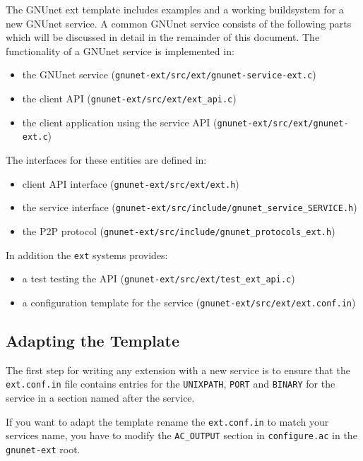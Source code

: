 \documentclass[10pt]{article}
\begin{document}
The GNUnet ext template includes examples and a working buildsystem for a new GNUnet service.
A common GNUnet service consists of the following parts which will be discussed in detail in the
remainder of this document. The functionality of a GNUnet service is implemented in:

\begin{itemize}
\itemsep0em
  \item the GNUnet service (\lstinline|gnunet-ext/src/ext/gnunet-service-ext.c|)
  \item the client API (\lstinline|gnunet-ext/src/ext/ext_api.c|)
  \item the client application using the service API (\lstinline|gnunet-ext/src/ext/gnunet-ext.c|)


\end{itemize}

The interfaces for these entities are defined in:
\begin{itemize}
\itemsep0em
  \item client API interface (\lstinline|gnunet-ext/src/ext/ext.h|)
  \item the service interface (\lstinline|gnunet-ext/src/include/gnunet_service_SERVICE.h|)
  \item the P2P protocol (\lstinline|gnunet-ext/src/include/gnunet_protocols_ext.h|)
\end{itemize}


In addition the \texttt{ext} systems provides:
\begin{itemize}
\itemsep0em
  \item a test testing the API (\lstinline|gnunet-ext/src/ext/test_ext_api.c|)
  \item a configuration template for the service (\lstinline|gnunet-ext/src/ext/ext.conf.in|)
\end{itemize}


\subsection{Adapting the Template}

The first step for writing any extension with a new service is to
ensure that the {\tt ext.conf.in} file contains entries for the
\texttt{UNIXPATH}, \texttt{PORT} and \texttt{BINARY} for the service in a section named after
the service.

If you want to adapt the template rename the {\tt ext.conf.in} to match your
services name, you have to modify the \texttt{AC\_OUTPUT} section in {\tt configure.ac}
in the \texttt{gnunet-ext} root.
\end{document}

